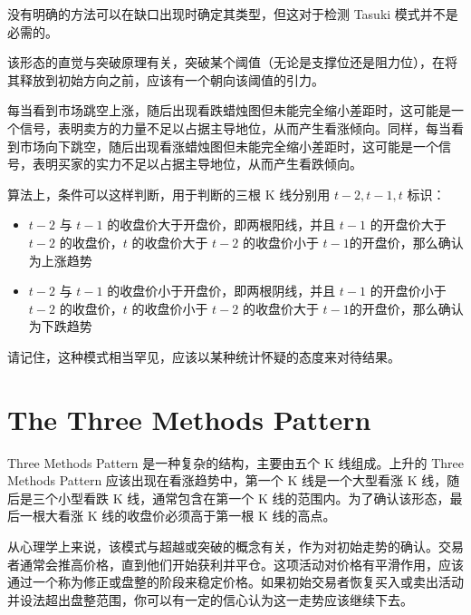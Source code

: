 没有明确的方法可以在缺口出现时确定其类型，但这对于检测 Tasuki 模式并不是必需的。


该形态的直觉与突破原理有关，突破某个阈值（无论是支撑位还是阻力位），在将其释放到初始方向之前，应该有一个朝向该阈值的引力。

每当看到市场跳空上涨，随后出现看跌蜡烛图但未能完全缩小差距时，这可能是一个信号，表明卖方的力量不足以占据主导地位，从而产生看涨倾向。同样，每当看到市场向下跳空，随后出现看涨蜡烛图但未能完全缩小差距时，这可能是一个信号，表明买家的实力不足以占据主导地位，从而产生看跌倾向。

算法上，条件可以这样判断，用于判断的三根 K 线分别用 $t-2,t-1,t$ 标识：
\begin{itemize}
    \item $t-2$ 与 $t-1$ 的收盘价大于开盘价，即两根阳线，并且 $t-1$ 的开盘价大于 $t-2$ 的收盘价，$t$ 的收盘价大于 $t-2$ 的收盘价小于 $t-1$的开盘价，那么确认为上涨趋势
    \item $t-2$ 与 $t-1$ 的收盘价小于开盘价，即两根阴线，并且 $t-1$ 的开盘价小于 $t-2$ 的收盘价，$t$ 的收盘价小于 $t-2$ 的收盘价大于 $t-1$的开盘价，那么确认为下跌趋势
\end{itemize}

请记住，这种模式相当罕见，应该以某种统计怀疑的态度来对待结果。
\section{The Three Methods Pattern}
Three Methods Pattern 是一种复杂的结构，主要由五个 K 线组成。上升的 Three Methods Pattern 应该出现在看涨趋势中，第一个 K 线是一个大型看涨 K 线，随后是三个小型看跌 K 线，通常包含在第一个 K 线的范围内。为了确认该形态，最后一根大看涨 K 线的收盘价必须高于第一根 K 线的高点。

从心理学上来说，该模式与超越或突破的概念有关，作为对初始走势的确认。交易者通常会推高价格，直到他们开始获利并平仓。这项活动对价格有平滑作用，应该通过一个称为修正或盘整的阶段来稳定价格。如果初始交易者恢复买入或卖出活动并设法超出盘整范围，你可以有一定的信心认为这一走势应该继续下去。